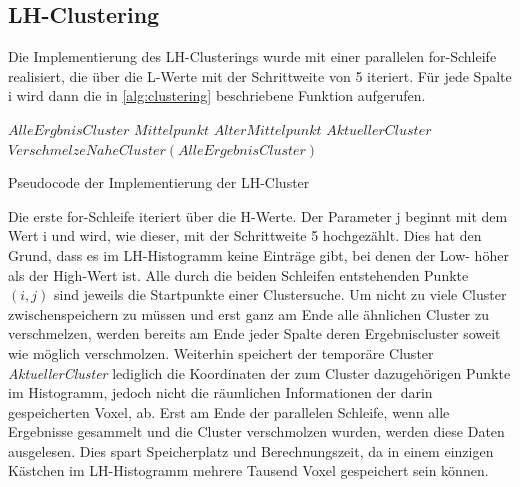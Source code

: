 \subsection{LH-Clustering}

Die Implementierung des LH-Clusterings wurde mit einer parallelen for-Schleife realisiert, die über die L-Werte mit der Schrittweite von 5 iteriert. Für jede Spalte i wird dann die in \autoref{alg:clustering} beschriebene Funktion aufgerufen.

\IncMargin{1em}
\begin{algorithm}

 \BlankLine
 $AlleErgbnisCluster$\;
 $Mittelpunkt$\;
 $AlterMittelpunkt$\;
 $AktuellerCluster$\;
$VerschmelzeNaheCluster(AlleErgebnisCluster)$\;
\;

 \caption{Pseudocode der Implementierung der LH-Cluster}
 \label{alg:clustering}
\end{algorithm}\DecMargin{1em}


Die erste for-Schleife iteriert über die H-Werte. Der Parameter j beginnt mit dem Wert i und wird, wie dieser, mit der Schrittweite 5 hochgezählt. Dies hat den Grund, dass es im LH-Histogramm keine Einträge gibt, bei denen der Low- höher als der High-Wert ist. Alle durch die beiden Schleifen entstehenden Punkte $(i, j)$ sind jeweils die Startpunkte einer Clustersuche.
\newline
Um nicht zu viele Cluster zwischenspeichern zu müssen und erst ganz am Ende alle ähnlichen Cluster zu verschmelzen, werden bereits am Ende jeder Spalte deren Ergebniscluster soweit wie möglich verschmolzen.
\newline
Weiterhin speichert der temporäre Cluster \textit{AktuellerCluster} lediglich die Koordinaten der zum Cluster dazugehörigen Punkte im Histogramm, jedoch nicht die räumlichen Informationen der darin gespeicherten Voxel, ab. Erst am Ende der parallelen Schleife, wenn alle Ergebnisse gesammelt und die Cluster verschmolzen wurden, werden diese Daten ausgelesen. Dies spart Speicherplatz und Berechnungszeit, da in einem einzigen Kästchen im LH-Histogramm mehrere Tausend Voxel gespeichert sein können.


